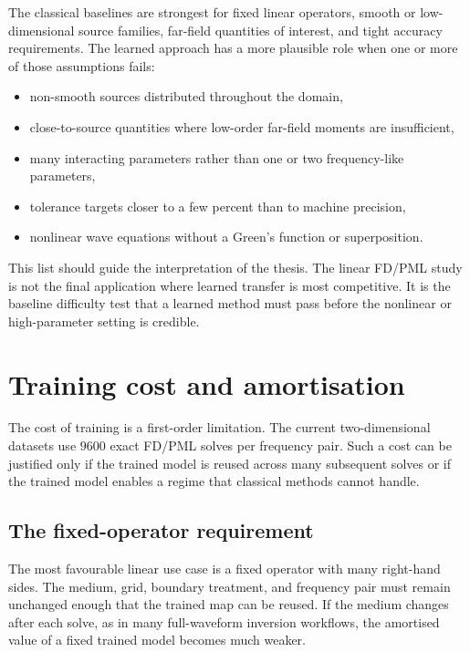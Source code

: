 The classical baselines are strongest for fixed linear operators, smooth or
low-dimensional source families, far-field quantities of interest, and tight
accuracy requirements. The learned approach has a more plausible role when
one or more of those assumptions fails:
\begin{itemize}
    \item non-smooth sources distributed throughout the domain,
    \item close-to-source quantities where low-order far-field moments are
    insufficient,
    \item many interacting parameters rather than one or two frequency-like
    parameters,
    \item tolerance targets closer to a few percent than to machine precision,
    \item nonlinear wave equations without a Green's function or
    superposition.
\end{itemize}

This list should guide the interpretation of the thesis. The linear FD/PML
study is not the final application where learned transfer is most competitive.
It is the baseline difficulty test that a learned method must pass before the
nonlinear or high-parameter setting is credible.

\section{Training cost and amortisation}
\label{sec:discussion-amortisation}

The cost of training is a first-order limitation. The current two-dimensional
datasets use $9600$ exact FD/PML solves per frequency pair. Such a cost can be
justified only if the trained model is reused across many subsequent solves or
if the trained model enables a regime that classical methods cannot handle.

\subsection{The fixed-operator requirement}
\label{subsec:discussion-fixed-operator}

The most favourable linear use case is a fixed operator with many right-hand
sides. The medium, grid, boundary treatment, and frequency pair must remain
unchanged enough that the trained map can be reused. If the medium changes
after each solve, as in many full-waveform inversion workflows, the amortised
value of a fixed trained model becomes much weaker.

